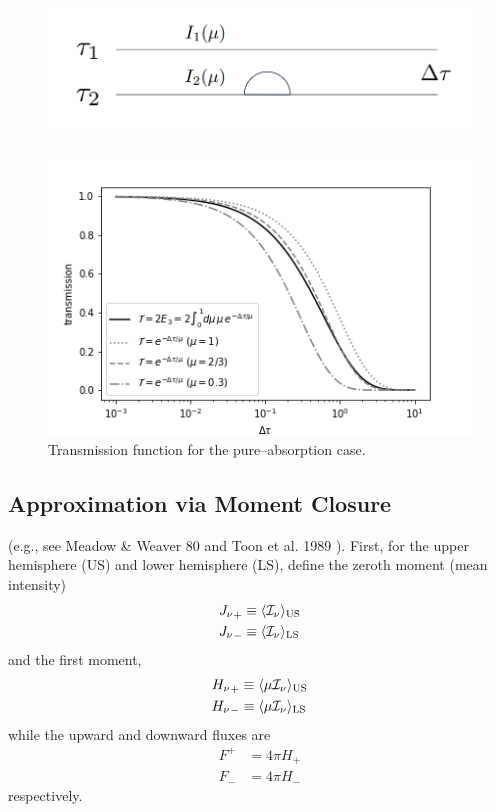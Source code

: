 \begin{figure}[htb]
\begin{center}
\includegraphics[width=\linewidth]{fig/layer1.PNG}
\caption{\label{fig:layer1}}
\end{center}
\end{figure}

\begin{figure}[htb]
\begin{center}
\includegraphics[width=\linewidth]{fig/transrt.PNG}
\caption{Transmission function for the pure–absorption case.\label{fig:transrt}}
\end{center}
\end{figure}



\subsection*{Approximation via Moment Closure}

(e.g., see Meadow \& Weaver 80 \cite{1980JAtS...37..630M} and Toon et al. 1989 \cite{1989JGR....9416287T}). First, for the upper hemisphere (US) and lower hemisphere (LS), define the zeroth moment (mean intensity)
\begin{align}
{J_\nu}_+ &\equiv \langle{\mathcal{I}_\nu} \rangle_\mathrm{US} \\
{J_\nu}_- &\equiv \langle{\mathcal{I}_\nu} \rangle_\mathrm{LS} 
\end{align}
and the first moment,
\begin{align}
{H_\nu}_+ &\equiv \langle\mu {\mathcal{I}_\nu} \rangle_\mathrm{US} \\
{H_\nu}_- &\equiv \langle\mu {\mathcal{I}_\nu} \rangle_\mathrm{LS} 
\end{align}
while the upward and downward fluxes are
\begin{align}
F^+ &= 4 \pi H_+ \\
F_- &= 4 \pi H_-
\end{align}
respectively.

